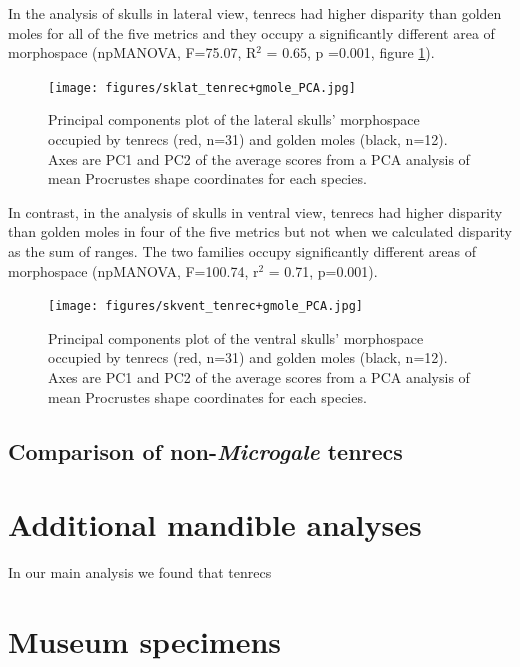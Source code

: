 \documentclass[12pt,a4paper]{article}
\begin{document}
In the analysis of skulls in lateral view, tenrecs had higher disparity than golden moles for all of the five metrics and they occupy a significantly different area of morphospace (npMANOVA, F=75.07, R$^{2}$ = 0.65,  p =0.001, figure \ref{fig:sklatPCA}).  


	\begin{figure}[H]
	\centering
	\texttt{[image: figures/sklat\_tenrec+gmole\_PCA.jpg]}
	\caption{Principal components plot of the lateral skulls' morphospace occupied by tenrecs (red, n=31) and golden moles (black, n=12). Axes are PC1 and PC2 of the average scores from a PCA analysis of mean Procrustes shape coordinates for each species. }
	\label{fig:sklatPCA}
	\end{figure}


In contrast, in the analysis of skulls in ventral view, tenrecs had higher disparity than golden moles in four of the five metrics but not when we calculated disparity as the sum of ranges.
The two families occupy significantly different areas of morphospace (npMANOVA, F=100.74, r$^{2}$ = 0.71, p=0.001).

	\begin{figure}[H]
	\centering
	\texttt{[image: figures/skvent\_tenrec+gmole\_PCA.jpg]}
	\caption{Principal components plot of the ventral skulls' morphospace occupied by tenrecs (red, n=31) and golden moles (black, n=12). Axes are PC1 and PC2 of the average scores from a PCA analysis of mean Procrustes shape coordinates for each species. }
	\label{fig:skventPCA}
	\end{figure}



\subsection{Comparison of non-\textit{Microgale} tenrecs}
\section{Additional mandible analyses}

In our main analysis we found that tenrecs


\section{Museum specimens}
	



\end{document}

